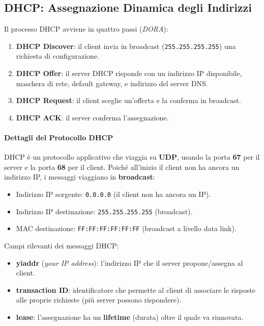 \subsection{DHCP: Assegnazione Dinamica degli Indirizzi}


Il processo DHCP avviene in quattro passi (\textit{DORA}):
\begin{enumerate}
    \item \textbf{DHCP Discover}: il client invia in broadcast (\texttt{255.255.255.255}) una richiesta di configurazione.
    \item \textbf{DHCP Offer}: il server DHCP risponde con un indirizzo IP disponibile, maschera di rete, default gateway, e indirizzo del server DNS.
    \item \textbf{DHCP Request}: il client sceglie un'offerta e la conferma in broadcast.
    \item \textbf{DHCP ACK}: il server conferma l'assegnazione.
\end{enumerate}


\paragraph{Dettagli del Protocollo DHCP}
DHCP è un protocollo applicativo che viaggia su \textbf{UDP}, usando la porta \textbf{67} per il server e la porta \textbf{68} per il client. Poiché all'inizio il client non ha ancora un indirizzo IP, i messaggi viaggiano in \textbf{broadcast}:
\begin{itemize}
    \item Indirizzo IP sorgente: \texttt{0.0.0.0} (il client non ha ancora un IP).
    \item Indirizzo IP destinazione: \texttt{255.255.255.255} (broadcast).
    \item MAC destinazione: \texttt{FF:FF:FF:FF:FF:FF} (broadcast a livello data link).
\end{itemize}
Campi rilevanti dei messaggi DHCP:
\begin{itemize}
    \item \textbf{yiaddr} (\textit{your IP address}): l'indirizzo IP che il server propone/assegna al client.
    \item \textbf{transaction ID}: identificatore che permette al client di associare le risposte alle proprie richieste (più server possono rispondere).
    \item \textbf{lease}: l'assegnazione ha un \textbf{lifetime} (durata) oltre il quale va rinnovata.
\end{itemize}

